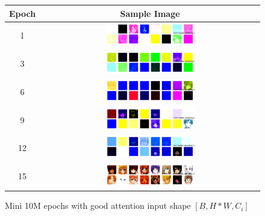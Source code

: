 \documentclass[twocolumn,superscriptaddress,aps]{revtex4-1}
\begin{document}
\begin{figure}[H]
\centering
\begin{tabular}{c|c}
Epoch & Sample Image \\
\hline
1 & \includegraphics[width=0.42\textwidth]{figures/mini_unet_ddpm_10M_ckpt_epoch_1_epoch_1_samples.png} \\
3 & \includegraphics[width=0.42\textwidth]{figures/mini_unet_ddpm_10M_ckpt_epoch_3_epoch_3_samples.png} \\
6 & \includegraphics[width=0.42\textwidth]{figures/mini_unet_ddpm_10M_ckpt_epoch_6_epoch_6_samples.png} \\
9 & \includegraphics[width=0.42\textwidth]{figures/mini_unet_ddpm_10M_ckpt_epoch_9_epoch_9_samples.png} \\
12 & \includegraphics[width=0.42\textwidth]{figures/mini_unet_ddpm_10M_ckpt_epoch_12_epoch_12_samples.png} \\
15 & \includegraphics[width=0.42\textwidth]{figures/mini_unet_ddpm_10M_ckpt_epoch_15_epoch_15_samples.png} 
\end{tabular}
\caption{Mini 10M epochs with good attention input shape $[B, H*W, C_i]$}
\label{tab:mini_10m_good_attention}
\end{figure}
\end{document}
